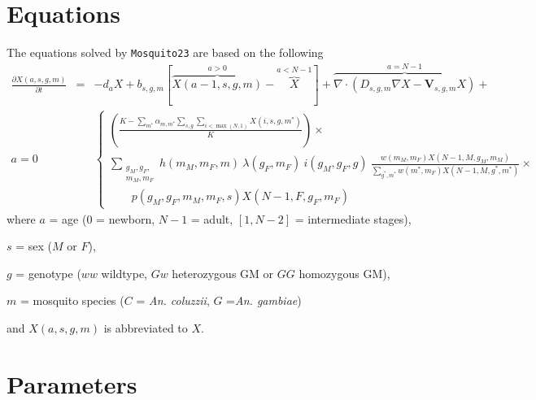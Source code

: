\documentclass[11pt,a4paper]{article}
\newcommand{\pd}[2]{\frac{\partial #1}{\partial #2}}
\begin{document}
\section{Equations}

The equations solved by {\tt Mosquito23} are based on the following
\begin{eqnarray*}
\pd{X(a,s,g,m)}{t} &=& -d_{a} X + b_{s,g,m} \left[ \overbrace{X(a-1,s,g,m)}^{a>0} - \overbrace{X}^{a<N-1} \right] + \overbrace{\nabla \cdot (D_{s,g,m} \nabla X - \mathbf{V}_{s,g,m} X)}^{a=N-1}
+ \\
a = 0 & & \begin{cases}
\displaystyle \left( \frac{K - \sum_{m^*} \alpha_{m, m^*} \sum_{s,g} \sum_{i<\max(N,1)} X(i,s,g,m^*)}{K} \right) \times \\
\displaystyle \sum_{\substack{g_M, g_F,\\m_M, m_F}}
h(m_M,m_F,m)\ \lambda(g_F, m_F)\ i(g_M, g_F, g)\ \frac{w(m_M, m_F) X(N-1,M,g_M,m_M)}{\sum_{g^*,m^*} w(m^*, m_F) X(N-1,M,g^*,m^*)} \times \\
\qquad p(g_M, g_F, m_M, m_F, s) X(N-1,F,g_F,m_F) 
\end{cases}
\end{eqnarray*}
where $a$ = age ($0$ = newborn, $N-1$ = adult, $[1, N-2]$ = intermediate stages), 

$s$ = sex ($M$ or $F$), 

$g$ = genotype ($ww$ wildtype, $Gw$ heterozygous GM or $GG$ homozygous GM), 

$m$ = mosquito species ($C$ = \textit{An. coluzzii}, $G$ =\textit{An. gambiae})

and $X(a,s,g,m)$ is abbreviated to $X$.
\section{Parameters}
\end{document}
